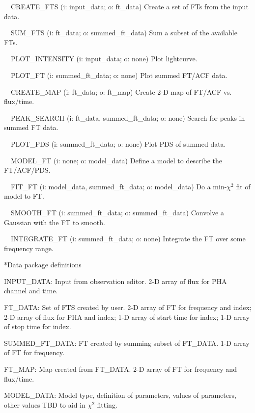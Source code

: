 \item{\phantom{2)}}~~CREATE\_FTS (i: input\_data; o: ft\_data)
\itemitem{}Create a set of FTs from the input data.

\item{\phantom{2)}}~~SUM\_FTS (i: ft\_data; o: summed\_ft\_data)
\itemitem{}Sum a subset of the available FTs.

\item{\phantom{2)}}~~PLOT\_INTENSITY (i: input\_data; o: none)
\itemitem{}Plot lightcurve.

\item{\phantom{2)}}~~PLOT\_FT (i: summed\_ft\_data; o: none)
\itemitem{}Plot summed FT/ACF data.

\item{\phantom{2)}}~~CREATE\_MAP (i:  ft\_data; o: ft\_map)
\itemitem{}Create 2-D map of FT/ACF vs. flux/time.

\item{\phantom{2)}}~~PEAK\_SEARCH (i: ft\_data, summed\_ft\_data; o:
none)
\itemitem{}Search for peaks in summed FT data.

\item{\phantom{2)}}~~PLOT\_PDS (i: summed\_ft\_data; o: none)
\itemitem{}Plot PDS of summed data.

\item{\phantom{2)}}~~MODEL\_FT (i: none; o: model\_data)
\itemitem{}Define a model to describe the FT/ACF/PDS.

\item{\phantom{2)}}~~FIT\_FT (i: model\_data, summed\_ft\_data; o:
model\_data)
\itemitem{}Do a min-$\chi^{2}$ fit of model to FT.

\item{\phantom{2)}}~~SMOOTH\_FT (i: summed\_ft\_data; o:
summed\_ft\_data)
\itemitem{}Convolve a Gaussian with the FT to smooth.

\item{\phantom{2)}}~~INTEGRATE\_FT (i: summed\_ft\_data; o: none)
\itemitem{}Integrate the FT over some frequency range.


\**Data package definitions

{\list

INPUT\_DATA:  Input from observation editor.  2-D array of flux for
PHA channel and time.

FT\_DATA:  Set of FTS created by user.  2-D array of FT for frequency
and index; 2-D array of flux for PHA and index; 1-D array of start
time for index; 1-D array of stop time for index.

SUMMED\_FT\_DATA:  FT created by summing subset of FT\_DATA.  1-D
array of FT for frequency.

FT\_MAP: Map created from FT\_DATA.  2-D array of FT for frequency and
flux/time.

MODEL\_DATA:  Model type, definition of parameters, values of
parameters, other values TBD to aid in $\chi^{2}$ fitting.

}


